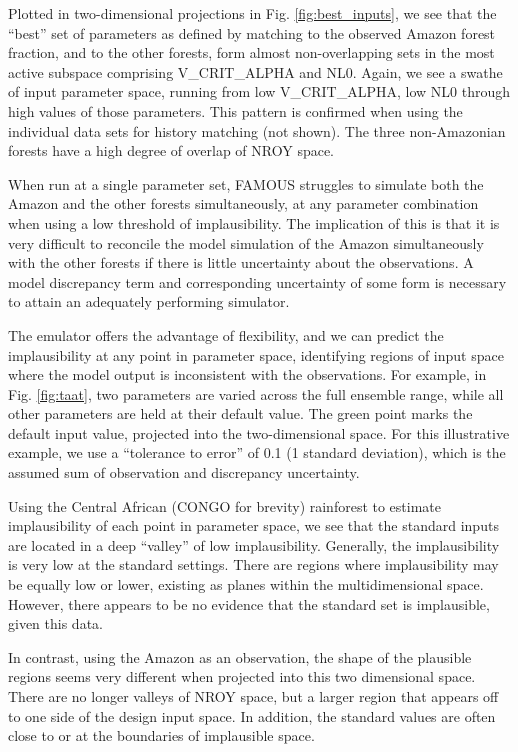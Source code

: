 \documentclass[esd, article]{copernicus} %
\begin{document}

Plotted in two-dimensional projections in Fig.  \ref{fig:best_inputs}, we see that the ``best'' set of parameters as defined by matching to the observed Amazon forest fraction, and to the other forests, form almost non-overlapping sets in the most active subspace comprising V\_CRIT\_ALPHA and NL0. Again, we see a swathe of input parameter space, running from low V\_CRIT\_ALPHA, low NL0 through high values of those parameters. This pattern is confirmed when using the individual data sets for history matching (not shown). The three non-Amazonian forests have a high degree of overlap of NROY space.

When run at a single parameter set, FAMOUS struggles to simulate both the Amazon and the other forests simultaneously, at any parameter combination when using a low threshold of implausibility. The implication of this is that it is very difficult to reconcile the model simulation of the Amazon simultaneously with the other forests if there is little uncertainty about the observations. A model discrepancy term and corresponding uncertainty of some form is necessary to attain an adequately performing simulator.

The emulator offers the advantage of flexibility, and we can predict the implausibility at any point in parameter space, identifying regions of input space where the model output is inconsistent with the observations. For example, in Fig.  \ref{fig:taat}, two parameters are varied across the full ensemble range, while all other parameters are held at their default value. The green point marks the default input value, projected into the two-dimensional space. For this illustrative example, we use a ``tolerance to error'' of 0.1 (1 standard deviation), which is the assumed sum of observation and discrepancy uncertainty.

Using the Central African (CONGO for brevity) rainforest to estimate implausibility of each point in parameter space, we see that the standard inputs are located in a deep ``valley'' of low implausibility. Generally, the implausibility is very low at the standard settings. There are regions where implausibility may be equally low or lower, existing as planes within the multidimensional space. However, there appears to be no evidence that the standard set is implausible, given this data.

In contrast, using the Amazon as an observation, the shape of the plausible regions seems very different when projected into this two dimensional space. There are no longer valleys of NROY space, but a larger region that appears off to one side of the design input space. In addition, the standard values are often close to or at the boundaries of implausible space.
\end{document}
